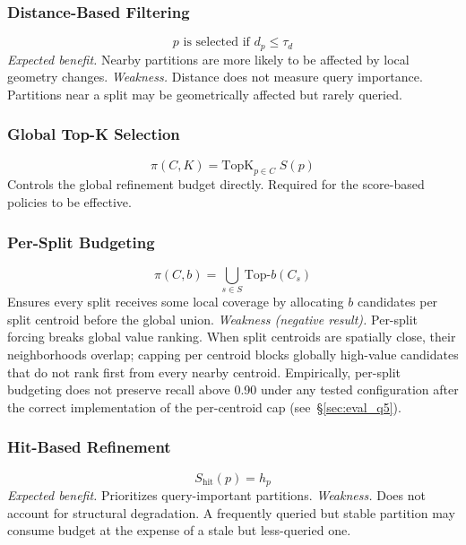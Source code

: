 \documentclass[sigconf, nonacm]{acmart}
\begin{document}
\subsubsection{Distance-Based Filtering}
\begin{equation}
  p \text{ is selected if } d_p \leq \tau_d
\end{equation}
\textit{Expected benefit.} Nearby partitions are more likely to be
affected by local geometry changes.
\textit{Weakness.} Distance does not measure query importance.
Partitions near a split may be geometrically affected but rarely queried.

\subsubsection{Global Top-K Selection}
\begin{equation}
  \pi(C, K) = \mathrm{TopK}_{p \in C}\; S(p)
\end{equation}
Controls the global refinement budget directly. Required for the
score-based policies to be effective.

\subsubsection{Per-Split Budgeting}
\begin{equation}
  \pi(C, b) = \bigcup_{s \in S} \mathrm{Top\text{-}}b(C_s)
\end{equation}
Ensures every split receives some local coverage by allocating $b$
candidates per split centroid before the global union.
\textit{Weakness (negative result).}
Per-split forcing breaks global value ranking. When split centroids
are spatially close, their neighborhoods overlap; capping per centroid
blocks globally high-value candidates that do not rank first from
every nearby centroid. Empirically, per-split budgeting does not
preserve recall above 0.90 under any tested configuration after the
correct implementation of the per-centroid cap
(see~\S\ref{sec:eval_q5}).

\subsubsection{Hit-Based Refinement}
\begin{equation}
  S_{\mathrm{hit}}(p) = h_p
\end{equation}
\textit{Expected benefit.} Prioritizes query-important partitions.
\textit{Weakness.} Does not account for structural degradation.
A frequently queried but stable partition may consume budget at the
expense of a stale but less-queried one.
\end{document}
